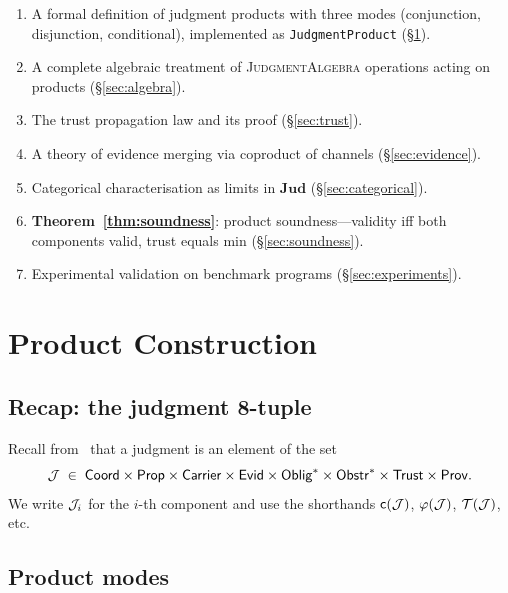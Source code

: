 \documentclass[11pt]{article}
\makeatletter
\newcommand{\ProdCat}{\mathbf{Jud}}               %
\newcommand{\etc}{etc.\@\xspace}                  %
\makeatother
\begin{document}
\begin{enumerate}
  \item A formal definition of judgment products with three modes
        (conjunction, disjunction, conditional), implemented as
        \texttt{JudgmentProduct} (\S\ref{sec:construction}).
  \item A complete algebraic treatment of \textsc{JudgmentAlgebra}
        operations acting on products (\S\ref{sec:algebra}).
  \item The trust propagation law and its proof (\S\ref{sec:trust}).
  \item A theory of evidence merging via coproduct of channels
        (\S\ref{sec:evidence}).
  \item Categorical characterisation as limits in $\ProdCat$
        (\S\ref{sec:categorical}).
  \item \textbf{Theorem~\ref{thm:soundness}}: product soundness---validity
        iff both components valid, trust equals min (\S\ref{sec:soundness}).
  \item Experimental validation on \ppFortyFourTotalPrograms{} benchmark programs
        (\S\ref{sec:experiments}).
\end{enumerate}

\section{Product Construction}\label{sec:construction}

\subsection{Recap: the judgment 8-tuple}

Recall from~\cite{jugeo02} that a judgment is an element of the set
\begin{equation}\label{eq:8tuple}
  \mathcal{J} \;\in\; \mathsf{Coord} \times \mathsf{Prop} \times \mathsf{Carrier}
            \times \mathsf{Evid} \times \mathsf{Oblig}^{*} \times
            \mathsf{Obstr}^{*} \times \mathsf{Trust} \times \mathsf{Prov}.
\end{equation}
We write $\mathcal{J}_i$ for the $i$-th component and use the shorthands
$\mathsf{c}(\mathcal{J})$, $\varphi(\mathcal{J})$, $\mathcal{T}(\mathcal{J})$, \etc

\subsection{Product modes}
\end{document}
